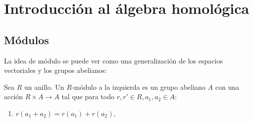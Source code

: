 \documentclass[a4paper,12pt,leqno]{report}
\begin{document}
\chapter*{Introducción al álgebra homológica}
\section*{Módulos}

La idea de módulo se puede ver como una generalización de los espacios vectoriales y los grupos abelianos:
\begin{definicion}
Sea $R$ un anillo. Un $R$-módulo a la izquierda es un grupo abeliano $A$ con una acción $R \times A \rightarrow A$ tal que para todo $r,r'\in R,a_1,a_2\in A$:
\begin{enumerate}
	\item $r(a_1+a_2)=r(a_1)+r(a_2),$
\end{enumerate}

\end{definicion}
\end{document}
